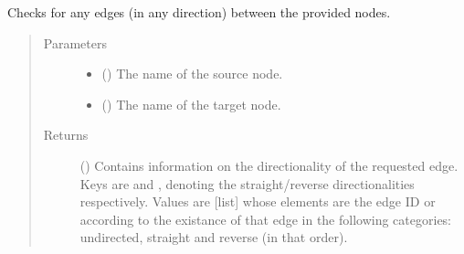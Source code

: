 \documentclass[letterpaper,10pt,english]{sphinxmanual}
\begin{document}
\begin{fulllineitems}
\begin{fulllineitems}
\end{fulllineitems}


\begin{fulllineitems}
\label{\detokenize{reference:pypath.main.PyPath.affects}}
\end{fulllineitems}


\begin{fulllineitems}
\label{\detokenize{reference:pypath.main.PyPath.all_between}}
Checks for any edges (in any direction) between the provided
nodes.
\begin{quote}\begin{description}
\item[{Parameters}] \leavevmode\begin{itemize}
\item {} 
 () \textendash{} The name of the source node.

\item {} 
 () \textendash{} The name of the target node.

\end{itemize}

\item[{Returns}] \leavevmode
() \textendash{} Contains information on the directionality of
the requested edge. Keys are  and , denoting
the straight/reverse directionalities respectively. Values
are {[}list{]} whose elements are the edge ID or 
according to the existance of that edge in the following
categories: undirected, straight and reverse (in that
order).

\end{description}\end{quote}

\end{fulllineitems}


\end{fulllineitems}
\end{document}
